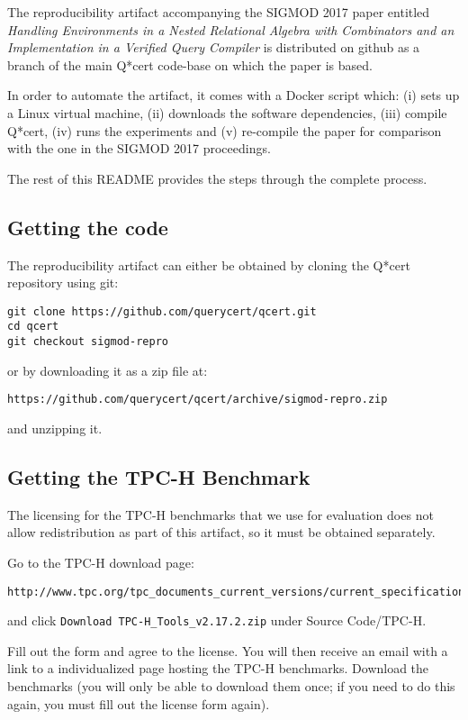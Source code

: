 \documentclass[acmsmall]{acmart}
\begin{document}
The reproducibility artifact accompanying the SIGMOD 2017 paper
entitled \textit{Handling Environments in a Nested Relational Algebra
  with Combinators and an Implementation in a Verified Query Compiler}
is distributed on github as a branch of the main Q*cert code-base on
which the paper is based.

In order to automate the artifact, it comes with a Docker script
which: (i) sets up a Linux virtual machine, (ii) downloads the
software dependencies, (iii) compile Q*cert, (iv) runs the experiments
and (v) re-compile the paper for comparison with the one in the SIGMOD
2017 proceedings.

The rest of this README provides the steps through the complete
process.

\subsection*{Getting the code}

The reproducibility artifact can either be obtained by cloning the
Q*cert repository using git:
\begin{verbatim}
git clone https://github.com/querycert/qcert.git
cd qcert
git checkout sigmod-repro
\end{verbatim}

or by downloading it as a zip file at:
\begin{verbatim}
https://github.com/querycert/qcert/archive/sigmod-repro.zip
\end{verbatim}

and unzipping it.

\subsection*{Getting the TPC-H Benchmark}

The licensing for the TPC-H benchmarks that we use for evaluation does
not allow redistribution as part of this artifact, so it must be
obtained separately.

Go to the TPC-H download page:
\begin{verbatim}
http://www.tpc.org/tpc_documents_current_versions/current_specifications.asp
\end{verbatim}

and click \verb+Download TPC-H_Tools_v2.17.2.zip+ under Source Code/TPC-H.

Fill out the form and agree to the license.  You will then receive an
email with a link to a individualized page hosting the TPC-H
benchmarks.  Download the benchmarks (you will only be able to
download them once; if you need to do this again, you must fill out
the license form again).
\end{document}
